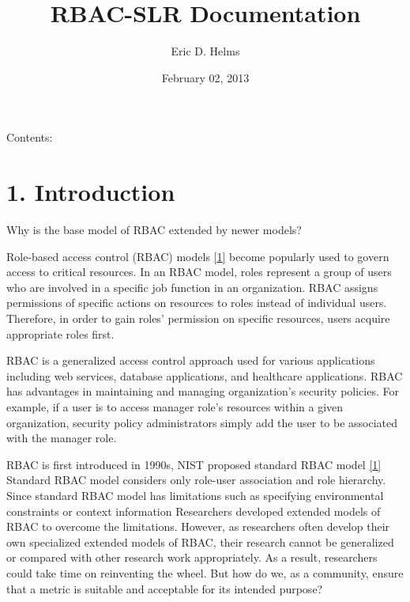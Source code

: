 \documentclass[letterpaper,10pt,english]{sphinxmanual}
\title{RBAC-SLR Documentation}
\date{February 02, 2013}
\author{Eric D. Helms}
\begin{document}
\maketitle
\tableofcontents
{}\label{index::doc}


Contents:


\chapter{1. Introduction}
\label{intro:introduction}\label{intro:systematic-literature-review-of-rbac-analysis-notes}\label{intro::doc}
Why is the base model of RBAC extended by newer models?

Role-based access control (RBAC) models {\hyperref[intro:ferraiolo-rbac]{{[}1{]}}} become popularly used to govern access to critical resources.  In an RBAC model, roles represent a group of users who are involved in a specific job function in an organization. RBAC assigns permissions of specific actions on resources to roles instead of individual users.  Therefore, in order to gain roles' permission on specific resources, users acquire appropriate roles first.

RBAC is a generalized access control approach used for various applications including web services, database applications, and healthcare applications.  RBAC has advantages in maintaining and managing organization's security policies.  For example, if a user is to access manager role's resources within a given organization, security policy administrators simply add the user to be associated with the manager role.

RBAC is first introduced in 1990s, NIST proposed standard RBAC model {\hyperref[intro:ferraiolo-rbac]{{[}1{]}}}
Standard RBAC model considers only role-user association and role hierarchy.
Since standard RBAC model has limitations such as specifying environmental constraints or context information
Researchers developed extended models of RBAC to overcome the limitations.
However, as researchers often develop their own specialized extended models of RBAC,
their research cannot be generalized or compared with other research work appropriately.
As a result, researchers could take time on reinventing the wheel.
But how do we, as a community, ensure that a metric is suitable and acceptable for its intended purpose?
\end{document}
